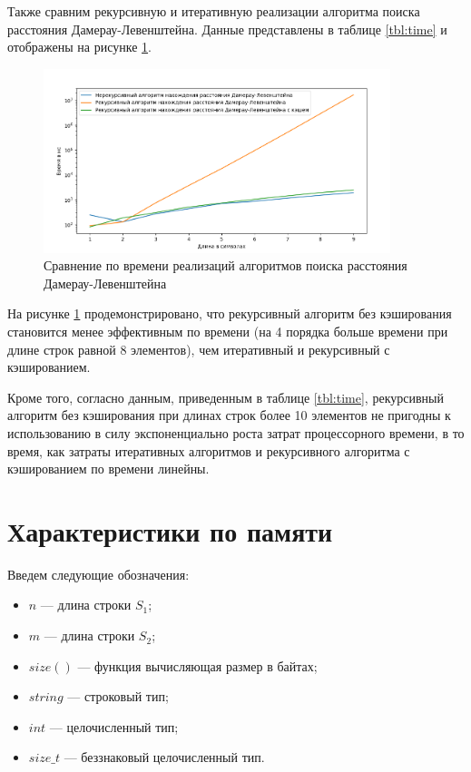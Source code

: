 Также сравним рекурсивную и итеративную реализации алгоритма поиска расстояния Дамерау-Левенштейна. Данные представлены в таблице \ref{tbl:time} и отображены на рисунке \ref{plt:time_02}.

\begin{figure}[!htbp]
	\centering
	\includegraphics[width=0.9\textwidth]{img/diag_02.png}
	\caption{Сравнение по времени реализаций алгоритмов поиска расстояния Дамерау-Левенштейна}
	\label{plt:time_02}
\end{figure}

На рисунке \ref{plt:time_02} продемонстрировано, что рекурсивный алгоритм без кэширования становится менее эффективным по времени (на 4 порядка больше времени при длине строк равной 8 элементов), чем итеративный и рекурсивный с кэшированием.

Кроме того, согласно данным, приведенным в таблице \ref{tbl:time}, рекурсивный алгоритм без кэширования при длинах строк более 10 элементов не пригодны к использованию в силу экспоненциально роста затрат процессорного времени, в то время, как затраты итеративных алгоритмов и рекурсивного алгоритма с кэшированием по времени линейны.

\section{Характеристики по памяти}

Введем следующие обозначения:
\begin{itemize}
	\item$n$ --- длина строки $S_{1}$;
	\item$m$ --- длина строки $S_{2}$;
	\item$size()$ --- функция вычисляющая размер в байтах;
	\item $string$ --- строковый тип;
	\item $int$ --- целочисленный тип;
	\item $size\_t$ --- беззнаковый целочисленный тип.
\end{itemize}

